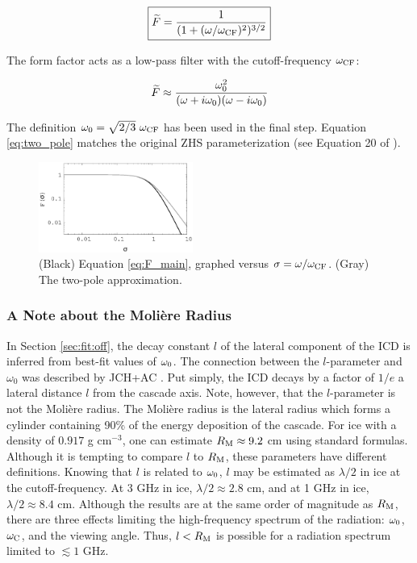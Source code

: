 \documentclass[amsmath,amssymb,aps,prd,10pt,twocolumn]{revtex4}
\begin{document}
\begin{equation}
\boxed{
\widetilde{F} = \frac{1}{(1+(\omega/\omega_{\rm CF})^2)^{3/2}}
} \label{eq:F_main}
\end{equation}

The form factor acts as a low-pass filter with the cutoff-frequency $\omega_{\rm CF}$:

\begin{equation}
\widetilde{F} \approx \frac{\omega_{\rm 0}^2}{(\omega+i\omega_{\rm 0})(\omega-i\omega_{\rm 0})} \label{eq:two_pole}
\end{equation}

The definition $\omega_{\rm 0} = \sqrt{2/3} ~ \omega_{\rm CF}$ has been used in the final step.  Equation \ref{eq:two_pole} matches the original ZHS parameterization (see Equation 20 of \cite{zhs}).

\begin{figure}
\centering
\includegraphics[width=0.45\textwidth]{April23_plot1.eps}
\caption{\label{fig:F}  (Black) Equation \ref{eq:F_main}, graphed versus $\sigma = \omega/\omega_{\rm CF}$. (Gray) The two-pole approximation.}
\end{figure}

\subsubsection{A Note about the Moli\`{e}re Radius}

In Section \ref{sec:fit:off}, the decay constant $l$ of the lateral component of the ICD is inferred from best-fit values of $\omega_{\rm 0}$.  The connection between the $l$-parameter and $\omega_0$ was described by JCH+AC \cite{10.1016/j.astropartphys.2017.03.008}.  Put simply, the ICD decays by a factor of $1/e$ a lateral distance $l$ from the cascade axis.  Note, however, that the $l$-parameter is not the Moli\`{e}re radius.  The Moli\`{e}re radius is the lateral radius which forms a cylinder containing 90\% of the energy deposition of the cascade.  For ice with a density of $0.917$ g cm$^{-3}$, one can estimate $R_{\rm M} \approx 9.2$ cm using standard formulas.  Although it is tempting to compare $l$ to $R_{\rm M}$, these parameters have different definitions. Knowing that $l$ is related to $\omega_{\rm 0}$, $l$ may be estimated as $\lambda/2$ in ice at the cutoff-frequency.  At 3 GHz in ice, $\lambda/2 \approx 2.8$ cm, and at 1 GHz in ice, $\lambda/2 \approx 8.4$ cm.  Although the results are at the same order of magnitude as $R_{\rm M}$, there are three effects limiting the high-frequency spectrum of the radiation: $\omega_{\rm 0}$, $\omega_{\rm C}$, and the viewing angle.  Thus, $l < R_{\rm M}$ is possible for a radiation spectrum limited to $\lesssim 1$ GHz.  
\end{document}
